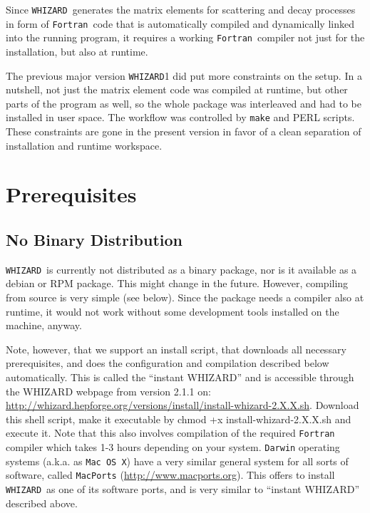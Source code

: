 \documentclass[12pt]{book}
\newenvironment{interaction}%
  {\begingroup\small
   \verbatim}%
  {\endverbatim
   \endgroup\noindent}
\newcommand{\ttt}[1]{\texttt{#1}}
\newcommand{\whizard}{\texttt{WHIZARD}}
\newcommand{\fortran}{\texttt{Fortran}}
\begin{document}
Since \whizard\ generates the matrix elements for scattering and decay
processes in form of \fortran\ code that is automatically compiled and
dynamically linked into the running program, it requires a working
\fortran\ compiler not just for the installation, but also at runtime.

The previous major version \whizard1 did put more constraints on the
setup.  In a nutshell, not just the matrix element code was compiled
at runtime, but other parts of the program as well, so the whole
package was interleaved and had to be installed in user space.  The
workflow was controlled by \ttt{make} and PERL scripts.  These
constraints are gone in the present version in favor of a clean
separation of installation and runtime workspace.


\section{\label{sec:prerequisites}Prerequisites}

\subsection{No Binary Distribution}

\whizard\ is currently not distributed as a binary package, nor is it
available as a debian or RPM package.  This might change in the
future.  However, compiling from source is very simple (see below).
Since the package needs a compiler also at runtime, it would not work
without some development tools installed on the machine, anyway. 

Note, however, that we support an install script, that downloads all
necessary prerequisites, and does the configuration and compilation
described below automatically. This is called the ``instant WHIZARD''
and is accessible through the WHIZARD webpage from version 2.1.1 on:
\url{http://whizard.hepforge.org/versions/install/install-whizard-2.X.X.sh}.
Download this shell script, make it executable by
\begin{interaction}
  chmod +x install-whizard-2.X.X.sh
\end{interaction}
and execute it. Note that this also involves compilation of the
required \ttt{Fortran} compiler which takes 1-3 hours depending on
your system.
\ttt{Darwin} operating systems (a.k.a. as \ttt{Mac OS X}) have a very
similar general system for all sorts of software, called
\ttt{MacPorts} (\url{http://www.macports.org}). This offers to install
\whizard\ as one of its software ports, and is very similar to
``instant WHIZARD'' described above. 
\end{document}
